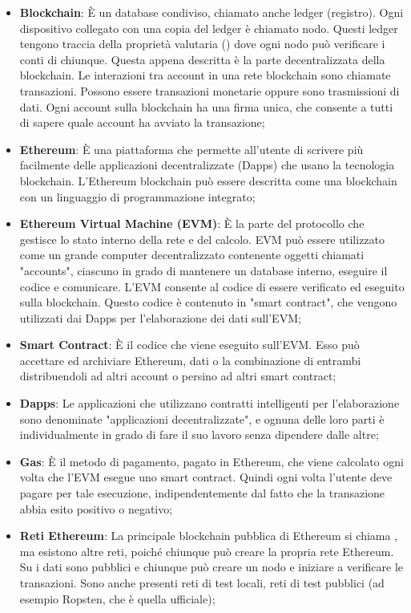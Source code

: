 \begin{itemize}
\item \textbf{Blockchain}: È un database condiviso, chiamato anche ledger (registro). Ogni dispositivo collegato con una copia del ledger è chiamato nodo. Questi ledger tengono traccia della proprietà valutaria () dove ogni nodo può verificare i conti di chiunque. Questa appena descritta \`e la parte decentralizzata della blockchain. Le interazioni tra account in una rete blockchain sono chiamate transazioni. Possono essere transazioni monetarie oppure sono trasmissioni di dati. Ogni account sulla blockchain ha una firma unica, che consente a tutti di sapere quale account ha avviato la transazione;
\item \textbf{Ethereum}: È una piattaforma che permette all'utente di scrivere più facilmente delle applicazioni decentralizzate (Dapps) che usano la tecnologia blockchain. L'Ethereum blockchain può essere descritta come una blockchain con un linguaggio di programmazione integrato;
\item \textbf{Ethereum Virtual Machine (EVM)}: È la parte del protocollo che gestisce lo stato interno della rete e del calcolo. EVM può essere utilizzato come un grande computer decentralizzato contenente oggetti chiamati "accounts", ciascuno in grado di mantenere un database interno, eseguire il codice e comunicare. L'EVM consente al codice di essere verificato ed eseguito sulla blockchain. Questo codice è contenuto in "smart contract", che vengono utilizzati dai Dapps per l'elaborazione dei dati sull'EVM;
\item \textbf{Smart Contract}: È il codice che viene eseguito sull'EVM. Esso può accettare ed archiviare Ethereum, dati o la combinazione di entrambi distribuendoli ad altri account o persino ad altri smart contract;
\item \textbf{Dapps}: Le applicazioni che utilizzano contratti intelligenti per l'elaborazione sono denominate "applicazioni decentralizzate", e ognuna delle loro parti \`e individualmente in grado di fare il suo lavoro senza dipendere dalle altre;
\item \textbf{Gas}: È il metodo di pagamento, pagato in  Ethereum, che viene calcolato ogni volta che l'EVM esegue uno smart contract. Quindi ogni volta l'utente deve pagare per tale esecuzione, indipendentemente dal fatto che la transazione abbia esito positivo o negativo;
\item \textbf{Reti Ethereum}: La principale blockchain pubblica di Ethereum si chiama , ma esistono altre reti, poiché chiunque può creare la propria rete Ethereum. Su  i dati sono pubblici e chiunque può creare un nodo e iniziare a verificare le transazioni. Sono anche presenti reti di test locali, reti di test pubblici (ad esempio Ropsten, che è quella ufficiale);

\end{itemize}
